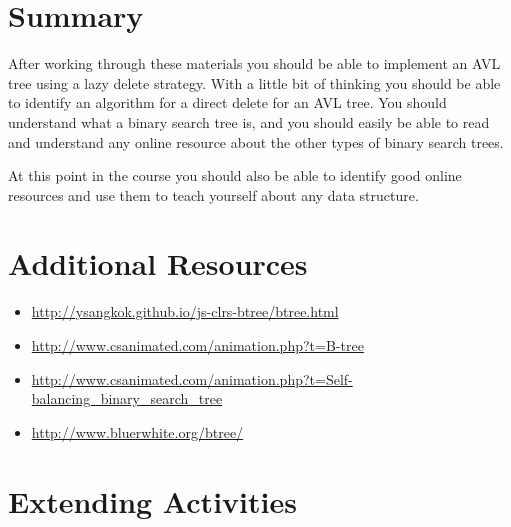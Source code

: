\section{Summary}

After working through these materials you should be able to implement an AVL tree using a lazy delete strategy.  With a little bit of thinking you should be able to identify an algorithm for a direct delete for an AVL tree.  You should understand what a binary search tree is, and you should easily be able to read and understand any online resource about the other types of binary search trees.  

At this point in the course you should also be able to identify good online resources and use them to teach yourself about any data structure.  



\section{Additional Resources}
\begin{itemize}
	\item \url{http://ysangkok.github.io/js-clrs-btree/btree.html}
	\item \url{http://www.csanimated.com/animation.php?t=B-tree}
	\item \url{http://www.csanimated.com/animation.php?t=Self-balancing\_binary\_search\_tree}
	\item \url{http://www.bluerwhite.org/btree/}
\end{itemize}

\section{Extending Activities}

